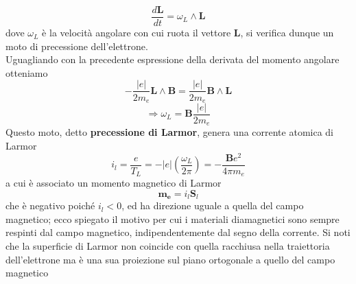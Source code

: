 \documentclass[
10pt, %
a4paper, %
oneside, %
headinclude,footinclude, %
BCOR5mm, %
]{scrartcl}
\begin{document}
\[\frac{d\mathbf{L}}{dt} = \omega_L \wedge \mathbf{L}\]
dove \(\omega_L\) è la velocità angolare con cui ruota il vettore \(\mathbf{L}\), si verifica dunque un moto di precessione dell'elettrone.\\
Uguagliando con la precedente espressione della derivata del momento angolare otteniamo
\[-\frac{|e|}{2m_e} \mathbf{L}\wedge \mathbf{B} = \frac{|e|}{2m_e} \mathbf{B}\wedge\mathbf{L}\]
\[\Rightarrow \omega_L = \mathbf{B}\frac{|e|}{2 m_e}\]
Questo moto, detto \textbf{precessione di Larmor}, genera una corrente atomica di Larmor
\[i_l = \frac{e}{T_L} = -|e|\left(\frac{\omega_L}{2\pi}\right)= -\frac{\mathbf{B}e^2}{4\pi m_e}\]
a cui è associato un momento magnetico di Larmor
\[\mathbf{m_e} = i_l \mathbf{S}_l\]
che è negativo poiché \(i_l < 0\), ed ha direzione uguale a quella del campo magnetico; ecco spiegato il motivo per cui i materiali diamagnetici sono sempre respinti dal campo magnetico, indipendentemente dal segno della corrente. Si noti che la superficie di Larmor non coincide con quella racchiusa nella traiettoria dell'elettrone ma è una sua proiezione sul piano ortogonale a quello del campo magnetico
\end{document}

